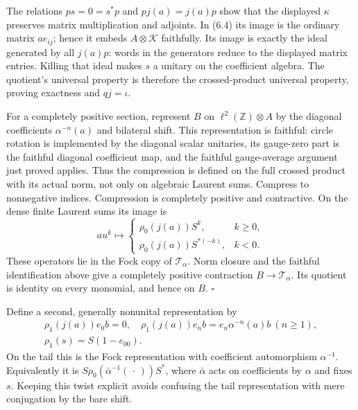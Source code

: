 \documentclass[
  11pt,
]{article}
\begin{document}
The relations \(ps=0=s^*p\) and \(pj(a)=j(a)p\) show that the displayed
\(\kappa\) preserves matrix multiplication and adjoints. In (6.4) its
image is the ordinary matrix \(a e_{ij}\); hence it embeds
\(A\otimes\mathcal K\) faithfully. Its image is exactly the ideal
generated by all \(j(a)p\): words in the generators reduce to the
displayed matrix entries. Killing that ideal makes \(s\) a unitary on
the coefficient algebra. The quotient's universal property is therefore
the crossed-product universal property, proving exactness and
\(qj=\iota\).

For a completely positive section, represent \(B\) on
\(\ell^2(\mathbb Z)\otimes A\) by the diagonal coefficients
\(\alpha^{-n}(a)\) and bilateral shift. This representation is faithful:
circle rotation is implemented by the diagonal scalar unitaries, its
gauge-zero part is the faithful diagonal coefficient map, and the
faithful gauge-average argument just proved applies. Thus the
compression is defined on the full crossed product with its actual norm,
not only on algebraic Laurent sums. Compress to nonnegative indices.
Compression is completely positive and contractive. On the dense finite
Laurent sums its image is \[
au^k\longmapsto
\begin{cases}
\rho_0(j(a))S^k,&k\ge0,\\
\rho_0(j(a))S^{*(-k)},&k<0.
\end{cases}
\tag{6.5}
\] These operators lie in the Fock copy of \(\mathcal T_\alpha\). Norm
closure and the faithful identification above give a completely positive
contraction \(B\to\mathcal T_\alpha\). Its quotient is identity on every
monomial, and hence on \(B\). \(\square\)

Define a second, generally nonunital representation by \[
\begin{gathered}
\rho_1(j(a))e_0b=0,\quad
\rho_1(j(a))e_nb=e_n\alpha^{-n}(a)b\ (n\ge1),\\
\rho_1(s)=S(1-e_{00}).
\end{gathered}
\tag{6.6}
\] On the tail this is the Fock representation with coefficient
automorphism \(\alpha^{-1}\). Equivalently it is
\(S\rho_0(\bar\alpha^{-1}(\,\cdot\,))S^*\), where \(\bar\alpha\) acts on
coefficients by \(\alpha\) and fixes \(s\). Keeping this twist explicit
avoids confusing the tail representation with mere conjugation by the
bare shift.
\end{document}
